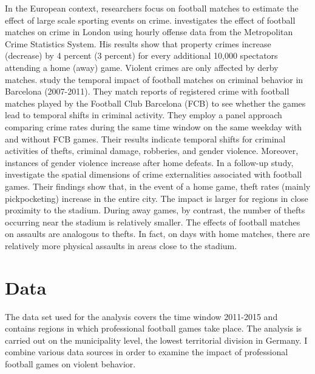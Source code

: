 In the European context, researchers focus on football matches to estimate the effect of large scale sporting events on crime. \cite{marie2016police} investigates the effect of football matches on crime in London using hourly offense data from the Metropolitan Crime Statistics System. His results show that property crimes increase (decrease) by 4 percent (3 percent) for every additional 10,000 spectators attending a home (away) game. Violent crimes are only affected by derby matches. \cite{montolio2016time} study the temporal impact of football matches on criminal behavior in Barcelona (2007-2011). They match reports of registered crime with football matches played by the Football Club Barcelona (FCB) to see whether the games lead to temporal shifts in criminal activity. They employ a panel approach comparing crime rates during the same time window on the same weekday with and without FCB games. Their results indicate temporal shifts for criminal activities of thefts, criminal damage, robberies, and gender violence. Moreover, instances of gender violence increase after home defeats. In a follow-up study, \cite{montolio2019measuring} investigate the spatial dimensions of crime externalities associated with football games. Their findings show that, in the event of a home game, theft rates (mainly pickpocketing) increase in the entire city. The impact is larger for regions in close proximity to the stadium. During away games, by contrast, the number of thefts occurring near the stadium is relatively smaller. The effects of football matches on assaults are analogous to thefts. In fact, on days with home matches, there are relatively more physical assaults in areas close to the stadium.





\bigskip
\section{Data}\label{sec_soc_ext:data} 
The data set used for the analysis covers the time window 2011-2015 and contains regions in which professional football games take place. The analysis is carried out on the municipality level, the lowest territorial division in Germany. I combine various data sources in order to examine the impact of professional football games on violent behavior.



